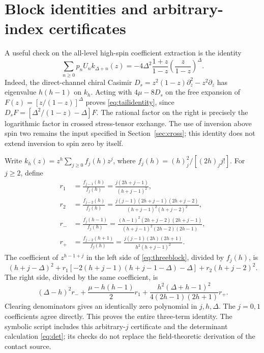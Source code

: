 \documentclass[11pt,a4paper]{article}
\numberwithin{equation}{section}
\theoremstyle{remark}\newtheorem{remark}[theorem]{Remark}
\begin{document}
\section{Block identities and arbitrary-index certificates}
\label{app:certificate}

A useful check on the all-level high-spin coefficient extraction is the identity
\begin{equation}
 \sum_{n\geq0}p_n U_n k_{\Delta+n}(z)
 =-4\Delta^2\frac{1+z}{1-z}\left(\frac{z}{1-z}\right)^\Delta.
 \label{eq:tailidentity}
\end{equation}
Indeed, the direct-channel chiral Casimir
$D_s=z^2(1-z)\partial_z^2-z^2\partial_z$ has eigenvalue $h(h-1)$ on $k_h$.
Acting with $4\mu-8D_s$ on the free expansion of
$F(z)=[z/(1-z)]^\Delta$ proves \eqref{eq:tailidentity}, since
$D_sF=[\Delta^2/(1-z)-\Delta]F$.
The rational factor on the right is precisely the logarithmic factor in crossed stress-tensor exchange. The use of inversion above spin two remains the input specified in Section~\ref{sec:cross}; this identity does not extend inversion to spin zero by itself.

Write $k_h(z)=z^h\sum_{j\geq0}f_j(h)z^j$, where
$f_j(h)=(h)_j^2/[(2h)_j j!]$. For $j\geq2$, define
\begin{align}
 r_1&=\frac{f_{j-1}(h)}{f_j(h)}
 =\frac{j(2h+j-1)}{(h+j-1)^2},\\
 r_2&=\frac{f_{j-2}(h)}{f_j(h)}
 =\frac{j(j-1)(2h+j-1)(2h+j-2)}{(h+j-1)^2(h+j-2)^2},\\
 r_-&=\frac{f_j(h-1)}{f_j(h)}
 =\frac{(h-1)^2(2h+j-2)(2h+j-1)}{(h+j-1)^2(2h-2)(2h-1)},\\
 r_+&=\frac{f_{j-2}(h+1)}{f_j(h)}
 =\frac{j(j-1)(2h)(2h+1)}{h^2(h+j-1)^2}.
\end{align}
The coefficient of $z^{h-1+j}$ in the left side of \eqref{eq:threeblock}, divided by $f_j(h)$, is
\begin{equation}
 (h+j-\Delta)^2+r_1[-2(h+j-1)(h+j-1-\Delta)-\Delta]
 +r_2(h+j-2)^2.
\end{equation}
The right side, divided by the same coefficient, is
\begin{equation}
 (\Delta-h)^2r_-+\frac{\mu-h(h-1)}2r_1
 +\frac{h^2(\Delta+h-1)^2}{4(2h-1)(2h+1)}r_+.
\end{equation}
Clearing denominators gives an identically zero polynomial in $j,h,\Delta$. The $j=0,1$ coefficients agree directly. This proves the entire three-term identity. The symbolic script includes this arbitrary-$j$ certificate and the determinant calculation \eqref{eq:det}; its checks do not replace the field-theoretic derivation of the contact source.
\end{document}
